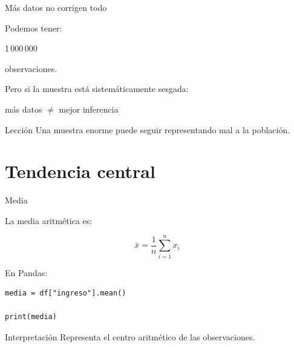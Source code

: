 \documentclass[aspectratio=169,11pt]{beamer}
\begin{document}

\begin{frame}{Más datos no corrigen todo}

Podemos tener:

\begin{center}

{\Huge
1\,000\,000
}

\vspace{0.3cm}

observaciones.

\end{center}

Pero si la muestra está sistemáticamente sesgada:

\begin{center}

\Large
más datos $\neq$ mejor inferencia
\end{center}

\vspace{0.4cm}

\begin{alertblock}{Lección}
Una muestra enorme puede seguir representando mal a la población.
\end{alertblock}

\end{frame}

\section{Tendencia central}

\begin{frame}[fragile]{Media}

La media aritmética es:

\[
\bar{x}
=
\frac{1}{n}
\sum_{i=1}^{n}x_i
\]

En Pandas:

\begin{lstlisting}
media = df["ingreso"].mean()

print(media)
\end{lstlisting}

\begin{block}{Interpretación}
Representa el centro aritmético de las observaciones.
\end{block}

\end{frame}
\end{document}
